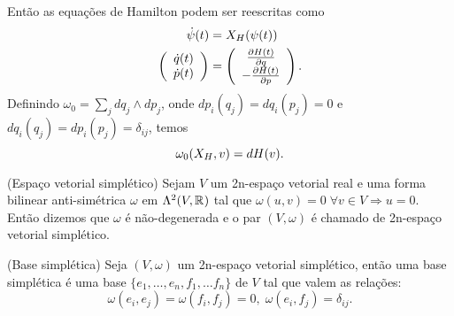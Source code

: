 \documentclass{beamer}
\begin{document}
	\begin{frame}
		Então as equações de Hamilton podem ser reescritas como 
		$$
		\begin{aligned}
		\dot{\psi}(t) &= X_{H}(\psi(t))
		\\
		\left(
		\begin{array}{c}
		\dot{q}(t)
		\\
		\dot{p}(t)
		\end{array}
		\right)
		&=
		\left(
		\begin{array}{c}
		\frac{\partial H(t)}{\partial q}
		\\
		-\frac{\partial H(t)}{\partial p}
		\end{array}
		\right).
		\end{aligned}
		$$
		Definindo $\omega_{0}= \sum_{j}  dq_{j}\wedge dp_{j}$, onde $dp_{i}(q_{j}) = dq_{i}(p_{j}) = 0$ e $dq_{i}(q_{j}) = dp_{i}(p_{j}) = \delta_{ij}$, temos
		$$
		\omega_{0}(X_{H}, v) = dH(v).
		$$
		
	\end{frame}
	
	\begin{frame}
		\begin{definicao}
			(Espaço vetorial simplético) Sejam $V$ um 2n-espaço vetorial real e uma forma bilinear anti-simétrica $\omega$ em $\Lambda^{2}(V, \mathbb{R}^{})$ tal que $\omega(u,v) = 0 \; \forall v \in V \Rightarrow u=0$. Então dizemos que $\omega$ é não-degenerada e o par $(V, \omega)$ é chamado de 2n-espaço vetorial simplético.
		\end{definicao}
		\begin{definicao}
			(Base simplética) Seja $(V, \omega)$ um 2n-espaço vetorial simplético, então uma base simplética é uma base $\{ e_{1},\dots, e_{n},f_{1},\dots f_{n}\}$ de $V$ tal que valem as relações:
			$$
			\omega(e_{i}, e_{j}) = \omega(f_{i}, f_{j}) = 0, \; \omega(e_{i}, f_{j}) = \delta_{ij}.
			$$
		\end{definicao}
		
	\end{frame}
	
\end{document}
